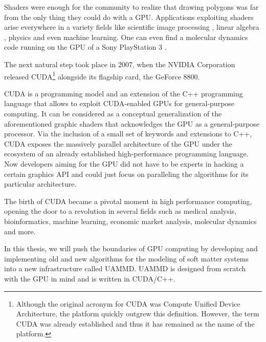 \documentclass[twoside,openright,titlepage,numbers=noenddot,%
headinclude,footinclude,cleardoublepage=empty,abstract=on,
BCOR=5mm,fontsize=11pt, dvipsnames, paper=b5
]{scrreprt}
\newcommand{\uammd}{\gls{UAMMD}\xspace}
\newcommand{\gpu}{\gls{GPU}\xspace}
\begin{document}
Shaders were enough for the community to realize that drawing polygons was far from the only thing they could do with a \gpu\cite{gpgpu2002}. Applications exploiting shaders arise everywhere in a variety fields like scientific image processing \cite{gpuimage2003, gpuimage2006}, linear algebra \cite{gpulinalg2001, gpulinalg2003a, gpulinalg2003b}, physics \cite{gpulbm2004} and even machine learning\cite{gpuml2005, gpuml1998}. One can even find a molecular dynamics code running on the \gpu of a Sony PlayStation 3 \cite{ps3md2009}.

The next natural step took place in 2007, when the NVIDIA Corporation released CUDA\cite{cuda}\footnote{Although the original acronym for CUDA was Compute Unified Device Architecture, the platform quickly outgrew this definition. However, the term CUDA was already established and thus it has remained as the name of the platform.} alongside its flagship card, the GeForce 8800.

CUDA is a programming model and an extension of the C++ programming language that allows to exploit CUDA-enabled \glspl{GPU} for general-purpose computing. It can be considered as a conceptual generalization of the aforementioned graphic shaders that acknowledges the \gpu as a general-purpose processor. Via the inclusion of a small set of keywords and extensions to C++, CUDA exposes the massively parallel architecture of the \gpu under the ecosystem of an already established high-performance programming language.
Now developers aiming for the \gpu did not have to be experts in hacking a certain graphics \gls{API} and could just focus on paralleling the algorithms for its particular architecture.

The birth of CUDA became a pivotal moment in high performance computing, opening the door to a revolution in several fields such as medical analysis, bioinformatics, machine learning, economic market analysis, molecular dynamics and more.

In this thesis, we will push the boundaries of \gpu computing by developing and implementing old and new algorithms for the modeling of soft matter systems into a new infrastructure called \uammd. \uammd is designed from scratch with the \gpu in mind and is written in CUDA/C++.
\end{document}
